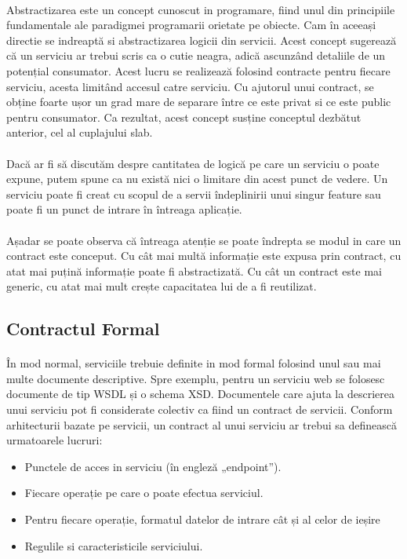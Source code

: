 \documentclass[12pt]{report}
\begin{document}
  	\paragraph{}Abstractizarea este un concept cunoscut in programare, fiind unul din principiile fundamentale ale paradigmei programarii orietate pe obiecte. Cam în aceeași directie se indreaptă si abstractizarea logicii din servicii. Acest concept sugerează că un serviciu ar trebui scris ca o cutie neagra, adică ascunzând detaliile de un potențial consumator. Acest lucru se realizează folosind contracte pentru fiecare serviciu, acesta limitând accesul catre serviciu. Cu ajutorul unui contract, se obține foarte ușor un grad mare de separare între ce este privat si ce este public pentru consumator. Ca rezultat, acest concept susține conceptul dezbătut anterior, cel al cuplajului slab.\cite{erl2}
  	\paragraph{}Dacă ar fi să discutăm despre cantitatea de logică pe care un serviciu o poate expune, putem spune ca nu există nici o limitare din acest punct de vedere. Un serviciu poate fi creat cu scopul de a servii îndeplinirii unui singur feature sau poate fi un punct de intrare în întreaga aplicație.
  	\paragraph{}Așadar se poate observa că întreaga atenție se poate îndrepta se modul in care un contract este conceput. Cu cât mai multă informație este expusa prin contract, cu atat mai puțină informație poate fi abstractizată. Cu cât un contract este mai generic, cu atat mai mult crește capacitatea lui de a fi reutilizat.
  	\subsection{Contractul Formal}
  	\paragraph{}În mod normal, serviciile trebuie definite in mod formal folosind unul sau mai multe documente descriptive. Spre exemplu, pentru un serviciu web se folosesc documente de tip WSDL și o schema XSD. Documentele care ajuta la descrierea unui serviciu pot fi considerate colectiv ca fiind un contract de servicii. Conform arhitecturii bazate pe servicii, un contract al unui serviciu ar trebui sa definească urmatoarele lucruri:
  	\begin{itemize}
  	\item Punctele de acces in serviciu (în engleză „endpoint”).
  	\item Fiecare operație pe care o poate efectua serviciul.
  	\item Pentru fiecare operație, formatul datelor de intrare cât și al celor de ieșire
  	\item Regulile si caracteristicile serviciului.
  	\end{itemize}
\end{document}
